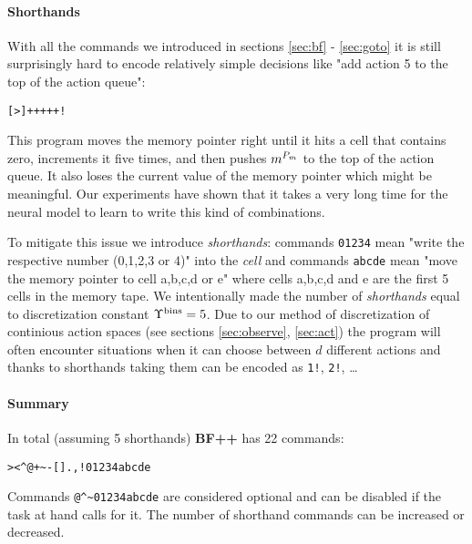 \paragraph{Shorthands}
\label{sec:shorthands}

With all the commands we introduced in sections \ref{sec:bf} - \ref{sec:goto} it is still surprisingly hard to encode relatively simple decisions like "add action 5 to the top of the action queue":

\begin{center}
\begin{lstlisting}
[>]+++++!
\end{lstlisting}
\end{center}

This program moves the memory pointer right until it hits a cell that contains zero, increments it five times, and then pushes $m^{P_m}$ to the top of the action queue. It also loses the current value of the memory pointer which might be meaningful. Our experiments have shown that it takes a very long time for the neural model to learn to write this kind of combinations.

To mitigate this issue we introduce \textit{shorthands}: commands \texttt{01234} mean "write the respective number (0,1,2,3 or 4)" into the \textit{cell} and commands \texttt{abcde} mean "move the memory pointer to cell a,b,c,d or e" where cells a,b,c,d and e are the first 5 cells in the memory tape.
We intentionally made the number of \textit{shorthands} equal to discretization constant $\Upsilon^\text{bins}=5$.
Due to our method of discretization of continious action spaces (see sections \ref{sec:observe}, \ref{sec:act}) the program will often encounter situations when it can choose between $d$ different actions and thanks to shorthands taking them can be encoded as \texttt{1!}, \texttt{2!}, \dots

\paragraph{Summary}
\label{sec:summary}

In total (assuming 5 shorthands) \textbf{BF++} has 22 commands:

\begin{center}
\begin{lstlisting}
><^@+~-[].,!01234abcde
\end{lstlisting}
\end{center}

Commands \verb|@^~01234abcde| are considered optional and can be disabled if the task at hand calls for it.
The number of shorthand commands can be increased or decreased.

